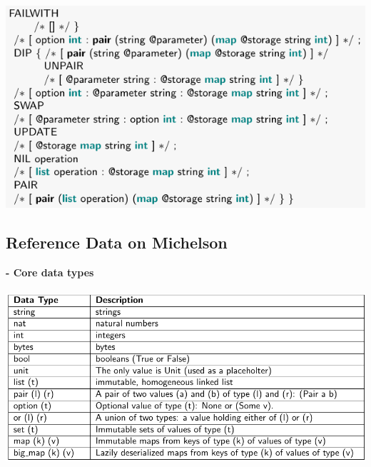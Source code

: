 \documentclass{article}
\begin{document}
\includegraphics[scale=0.4]{70.png}\\



\subsection{Reference Data on Michelson}
\textbf{- Core data types}\\\\
\includegraphics[scale=0.4]{72.png}\\\\
\end{document}
